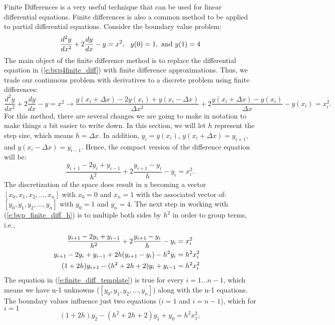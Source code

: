\documentclass[twoside]{article}
\def\ds{\displaystyle}
\begin{document}
Finite Differences is a very useful technique that can be used for linear differential equations. Finite differences is also a common method to be applied to partial differential equations. Consider the boundary value problem:
\begin{equation}
    \frac {d^2y}{dx^2} + 2 \frac {dy}{dx} - y = x^2, \ \ y(0)=1, \ {\rm and} \ y(1)=4
    \label{e:bvp4finite_diff}
\end{equation}
The main object of the finite difference method is to replace the differential equation in (\ref{e:bvp4finite_diff}) with finite difference approximations. Thus, we trade our continuous problem with derivatives to a discrete problem using finite differences:
\begin{equation*}
     \frac {d^2y}{dx^2} + 2 \frac {dy}{dx} - y = x^2 \rightarrow \frac {y(x_i+\Delta x) - 2y(x_i)+ y(x_i-\Delta x)}{\Delta x^2} + 2 \frac {y(x_i+\Delta x) -  y(x_i)}{\Delta x} - y(x_i) = x_i^2.
\end{equation*}
For this method, there are several changes we are going to make in notation to make things a bit easier to write down. In this section, we will let $h$ represent the step size, which means $h = \Delta x$. In addition, $\ds y_i = y(x_i)$, $\ds y(x_i+\Delta x) = y_{i+1}$, and $\ds y(x_i-\Delta x) = y_{i-1}$. Hence, the compact version of the difference equation will be:
\begin{equation}
 \frac {y_{i+1} - 2y_i+ y_{i-1}}{h^2} + 2 \frac {y_{i+1} - y_i}{h} - y_i = x_i^2.
 \label{e:bvp_finite_diff_h}
\end{equation}
The discretization of the space does result in x becoming a vector $[x_0, x_1, x_2, ..., x_n]$ with $x_0 = 0$ and $x_n = 1$ with the associated vector of: $[y_0, y_1, y_2, ..., y_n]$ with $y_0 = 1$ and $y_n = 4$. The next step in working with (\ref{e:bvp_finite_diff_h}) is to multiple both sides by $\ds h^2$ in order to group terms, i.e.,
\begin{align}
    \frac {y_{i+1} - 2y_i+ y_{i-1}}{h^2} + 2 \frac {y_{i+1} - y_i}{h} - y_i &= x_i^2 \cr
    y_{i+1} - 2y_i+ y_{i-1} + 2 h(y_{i+1} - y_i) - h^2y_i &= h^2x_i^2 \cr
   (1+2h)y_{i+1} - (h^2+2h+2)y_i + y_{i-1} &= h^2x_i^2
   \label{e:finite_diff_template}
\end{align}
The equation in (\ref{e:finite_diff_template}) is true for every $i = 1...n-1$, which means we have n-1 unknowns ($[y_0, y_1, y_2, ..., y_n]$) along with the n-1 equations. The boundary values influence just two equations ($i=1$ and $i=n-1$), which for $i=1$
$$(1+2h)y_{2} - (h^2+2h+2)y_1 + y_{0} = h^2x_1^2,$$
\end{document}
